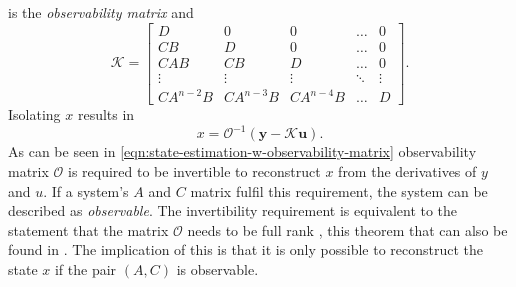 is the \textit{observability matrix} and
\[ \mathcal{K}=
\begin{bmatrix}
    D & 0 & 0 & \hdots & 0\\
    CB & D & 0 & \hdots & 0\\
    CAB & CB & D & \hdots & 0 \\
    \vdots & \vdots & \vdots & \ddots & \vdots \\
    CA^{n-2}B & CA^{n-3}B & CA^{n-4}B & \hdots & D
\end{bmatrix}.
\]
Isolating $x$ results in
\begin{equation}\label{eqn:state-estimation-w-observability-matrix}
    x = \mathcal{O}^{-1}(\mathbf{y}-\mathcal{K}\mathbf{u}).
\end{equation}
As can be seen in \eqref{eqn:state-estimation-w-observability-matrix} observability matrix $\mathcal{O}$ is required to be invertible to reconstruct $x$ from the derivatives of $y$ and $u$. If a system's $A$ and $C$ matrix fulfil this requirement, the system can be described as \textit{observable}. The invertibility requirement is equivalent to the statement that the matrix $\mathcal{O}$ needs to be full rank \cite[Section 2.9]{Lay2016LinearApplications}, this theorem that can also be found in \cite[Corollary 3.8]{Antsaklis2006LinearProcessing}. The implication of this is that it is only possible to reconstruct the state $x$ if the pair $(A,C)$ is observable. \\


